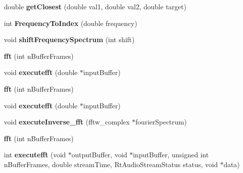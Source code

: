 \begin{DoxyCompactItemize}
\item 
\hypertarget{classfft_aabc3e2a71e82354eb9a32f74a05fc827}{double {\bfseries get\-Closest} (double val1, double val2, double target)}\label{classfft_aabc3e2a71e82354eb9a32f74a05fc827}

\item 
\hypertarget{classfft_a56763f8e5f244be9c6c52e74b56a9686}{int {\bfseries Frequency\-To\-Index} (double frequency)}\label{classfft_a56763f8e5f244be9c6c52e74b56a9686}

\item 
\hypertarget{classfft_a18b1a6865cc0e16f073ee3c0e6815fa4}{void {\bfseries shift\-Frequency\-Spectrum} (int shift)}\label{classfft_a18b1a6865cc0e16f073ee3c0e6815fa4}

\item 
\hypertarget{classfft_a5fff94ac07119207ddd05f628be5891d}{{\bfseries fft} (int n\-Buffer\-Frames)}\label{classfft_a5fff94ac07119207ddd05f628be5891d}

\item 
\hypertarget{classfft_a47e58fd4f715ad89a6fad8df9d715bf4}{void {\bfseries executefft} (double $\ast$input\-Buffer)}\label{classfft_a47e58fd4f715ad89a6fad8df9d715bf4}

\item 
\hypertarget{classfft_a5fff94ac07119207ddd05f628be5891d}{{\bfseries fft} (int n\-Buffer\-Frames)}\label{classfft_a5fff94ac07119207ddd05f628be5891d}

\item 
\hypertarget{classfft_a47e58fd4f715ad89a6fad8df9d715bf4}{void {\bfseries executefft} (double $\ast$input\-Buffer)}\label{classfft_a47e58fd4f715ad89a6fad8df9d715bf4}

\item 
\hypertarget{classfft_a228bd861564c189cd7b6800c950a1c09}{void {\bfseries execute\-Inverse\-\_\-fft} (fftw\-\_\-complex $\ast$fourier\-Spectrum)}\label{classfft_a228bd861564c189cd7b6800c950a1c09}

\item 
\hypertarget{classfft_a5fff94ac07119207ddd05f628be5891d}{{\bfseries fft} (int n\-Buffer\-Frames)}\label{classfft_a5fff94ac07119207ddd05f628be5891d}

\item 
\hypertarget{classfft_adc64c7e4f7bf74e0c98477043a94608e}{int {\bfseries executefft} (void $\ast$output\-Buffer, void $\ast$input\-Buffer, unsigned int n\-Buffer\-Frames, double stream\-Time, Rt\-Audio\-Stream\-Status status, void $\ast$data)}\label{classfft_adc64c7e4f7bf74e0c98477043a94608e}


\end{DoxyCompactItemize}
